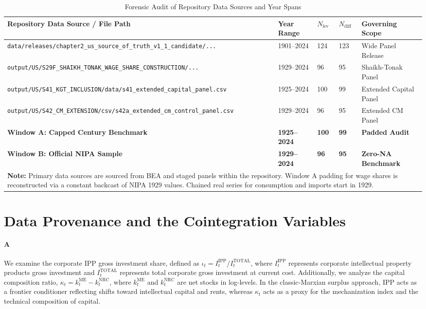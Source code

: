 \documentclass[11pt,a4paper]{article}
\begin{document}
\begin{table}[h!]
\centering
\small
\caption{Forensic Audit of Repository Data Sources and Year Spans}
\label{tab:sample_audit}
\begin{tabular}{p{7.0cm} p{2.2cm} p{1.6cm} p{1.6cm} p{2.2cm}}
\toprule
\textbf{Repository Data Source / File Path} & \textbf{Year Range} & \textbf{$N_{\text{lev}}$} & \textbf{$N_{\text{diff}}$} & \textbf{Governing Scope} \\
\midrule
\texttt{data/releases/chapter2\_us\_source\_of\_truth\_v1\_1\_candidate/...} & 1901--2024 & 124 & 123 & Wide Panel Release \\
\texttt{output/US/S29F\_SHAIKH\_TONAK\_WAGE\_SHARE\_CONSTRUCTION/...} & 1929--2024 & 96 & 95 & Shaikh-Tonak Panel \\
\texttt{output/US/S41\_KGT\_INCLUSION/data/s41\_extended\_capital\_panel.csv} & 1925--2024 & 100 & 99 & Extended Capital Panel \\
\texttt{output/US/S42\_CM\_EXTENSION/csv/s42a\_extended\_cm\_control\_panel.csv} & 1929--2024 & 96 & 95 & Extended CM Panel \\
\textbf{Window A: Capped Century Benchmark} & \textbf{1925--2024} & \textbf{100} & \textbf{99} & \textbf{Padded Audit} \\
\textbf{Window B: Official NIPA Sample} & \textbf{1929--2024} & \textbf{96} & \textbf{95} & \textbf{Zero-NA Benchmark} \\
\bottomrule
\multicolumn{5}{p{14.6cm}}{\footnotesize \textbf{Note:} Primary data sources are sourced from BEA and staged panels within the repository. Window A padding for wage shares is reconstructed via a constant backcast of NIPA 1929 values. Chained real series for consumption and imports start in 1929.}
\end{tabular}
\end{table}

\FloatBarrier
\section{Data Provenance and the Cointegration Variables}

\paragraph{A}
We examine the corporate IPP gross investment share, defined as $\iota_t = I^{\text{IPP}}_t / I^{\text{TOTAL}}_t$, where $I^{\text{IPP}}_t$ represents corporate intellectual property products gross investment and $I^{\text{TOTAL}}_t$ represents total corporate gross investment at current cost. Additionally, we analyze the capital composition ratio, $\kappa_t = k^{\text{ME}}_t - k^{\text{NRC}}_t$, where $k^{\text{ME}}_t$ and $k^{\text{NRC}}_t$ are net stocks in log-levels. In the classic-Marxian surplus approach, IPP acts as a frontier conditioner reflecting shifts toward intellectual capital and rents, whereas $\kappa_t$ acts as a proxy for the mechanization index and the technical composition of capital.
\end{document}

